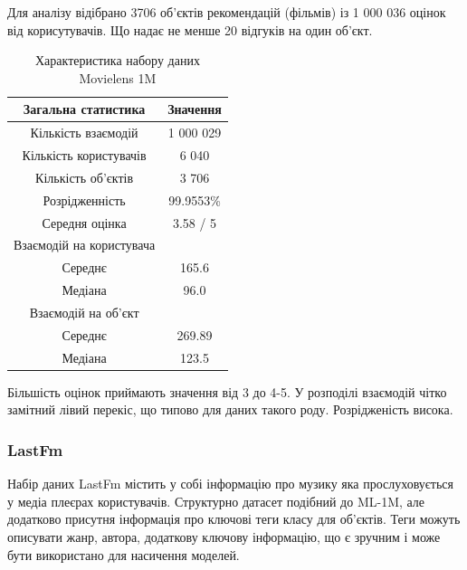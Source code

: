 Для аналізу відібрано 3706 об’єктів рекомендацій (фільмів) із 1 000 036  оцінок від корисутувачів. Що надає не менше 20 відгуків на один об’єкт.
\begin{table}[H]
    \centering
    \caption{Характеристика набору даних Movielens 1M}
    \begin{tabular}{|c|c|}
        \hline
        Загальна статистика      & Значення \\ \hline
        Кількість взаємодій      & 1 000 029                    \\
        Кількість користувачів   & 6 040                        \\
        Кількість об’єктів       & 3 706                        \\
        Розрідженність           & 99.9553\%                    \\
        Середня оцінка           & 3.58 / 5                     \\ \hline
        Взаємодій на користувача &                              \\ \hline
        Середнє                  & 165.6                        \\
        Медіана                  & 96.0                         \\ \hline
        Взаємодій на об’єкт      &                              \\ \hline
        Середнє                  & 269.89                       \\
        Медіана                  & 123.5                        \\ \hline
    \end{tabular}
    \label{tab:ML-1m}
\end{table}
Більшість оцінок приймають значення від 3 до 4-5. У розподілі взаємодій чітко замітний лівий перекіс, що типово для даних такого роду. Розрідженість висока.


\subsubsection{LastFm}
Набір даних LastFm містить у собі інформацію про музику яка прослуховується у медіа плеєрах користувачів. Структурно датасет подібний до ML-1M, але додатково присутня інформація про ключові теги класу для об’єктів. Теги можуть описувати жанр, автора, додаткову ключову інформацію, що є зручним і може бути використано для насичення моделей.


